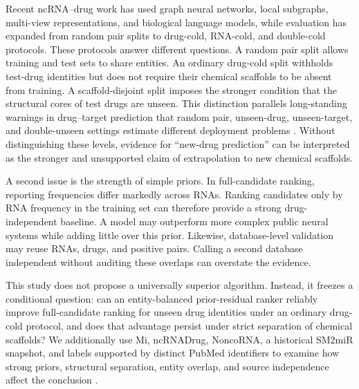\documentclass[10pt]{article}
\begin{document}
Recent ncRNA--drug work has used graph neural networks, local subgraphs, multi-view representations, and biological language models, while evaluation has expanded from random pair splits to drug-cold, RNA-cold, and double-cold protocols. These protocols answer different questions. A random pair split allows training and test sets to share entities. An ordinary drug-cold split withholds test-drug identities but does not require their chemical scaffolds to be absent from training. A scaffold-disjoint split imposes the stronger condition that the structural cores of test drugs are unseen. This distinction parallels long-standing warnings in drug--target prediction that random pair, unseen-drug, unseen-target, and double-unseen settings estimate different deployment problems \citep{pahikkala2015realistic}. Without distinguishing these levels, evidence for ``new-drug prediction'' can be interpreted as the stronger and unsupported claim of extrapolation to new chemical scaffolds.

A second issue is the strength of simple priors. In full-candidate ranking, reporting frequencies differ markedly across RNAs. Ranking candidates only by RNA frequency in the training set can therefore provide a strong drug-independent baseline. A model may outperform more complex public neural systems while adding little over this prior. Likewise, database-level validation may reuse RNAs, drugs, and positive pairs. Calling a second database independent without auditing these overlaps can overstate the evidence.

This study does not propose a universally superior algorithm. Instead, it freezes a conditional question: can an entity-balanced prior-residual ranker reliably improve full-candidate ranking for unseen drug identities under an ordinary drug-cold protocol, and does that advantage persist under strict separation of chemical scaffolds? We additionally use Mi, ncRNADrug, NoncoRNA, a historical SM2miR snapshot, and labels supported by distinct PubMed identifiers to examine how strong priors, structural separation, entity overlap, and source independence affect the conclusion \citep{cao2024ncrnadrug,li2020noncorna,liu2013sm2mir}.
\end{document}
